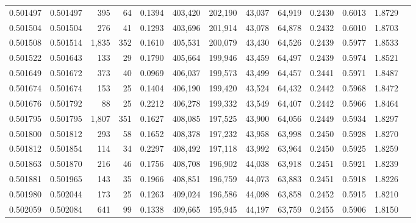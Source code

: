 \begin{tabular}{rrrrrrrrrrrrr}
0.501497 & 0.501497 &   395 &    64 &                                     0.1394 & 403,420 & 202,190 &  43,037 &  64,919 & 0.2430 & 0.6013 & 1.8729 \\
0.501504 & 0.501504 &   276 &    41 &                                     0.1293 & 403,696 & 201,914 &  43,078 &  64,878 & 0.2432 & 0.6010 & 1.8703 \\
0.501508 & 0.501514 & 1,835 &   352 &                                     0.1610 & 405,531 & 200,079 &  43,430 &  64,526 & 0.2439 & 0.5977 & 1.8533 \\
0.501522 & 0.501643 &   133 &    29 &                                     0.1790 & 405,664 & 199,946 &  43,459 &  64,497 & 0.2439 & 0.5974 & 1.8521 \\
0.501649 & 0.501672 &   373 &    40 &                                     0.0969 & 406,037 & 199,573 &  43,499 &  64,457 & 0.2441 & 0.5971 & 1.8487 \\
0.501674 & 0.501674 &   153 &    25 &                                     0.1404 & 406,190 & 199,420 &  43,524 &  64,432 & 0.2442 & 0.5968 & 1.8472 \\
0.501676 & 0.501792 &    88 &    25 &                                     0.2212 & 406,278 & 199,332 &  43,549 &  64,407 & 0.2442 & 0.5966 & 1.8464 \\
0.501795 & 0.501795 & 1,807 &   351 &                                     0.1627 & 408,085 & 197,525 &  43,900 &  64,056 & 0.2449 & 0.5934 & 1.8297 \\
0.501800 & 0.501812 &   293 &    58 &                                     0.1652 & 408,378 & 197,232 &  43,958 &  63,998 & 0.2450 & 0.5928 & 1.8270 \\
0.501812 & 0.501854 &   114 &    34 &                                     0.2297 & 408,492 & 197,118 &  43,992 &  63,964 & 0.2450 & 0.5925 & 1.8259 \\
0.501863 & 0.501870 &   216 &    46 &                                     0.1756 & 408,708 & 196,902 &  44,038 &  63,918 & 0.2451 & 0.5921 & 1.8239 \\
0.501881 & 0.501965 &   143 &    35 &                                     0.1966 & 408,851 & 196,759 &  44,073 &  63,883 & 0.2451 & 0.5918 & 1.8226 \\
0.501980 & 0.502044 &   173 &    25 &                                     0.1263 & 409,024 & 196,586 &  44,098 &  63,858 & 0.2452 & 0.5915 & 1.8210 \\
0.502059 & 0.502084 &   641 &    99 &                                     0.1338 & 409,665 & 195,945 &  44,197 &  63,759 & 0.2455 & 0.5906 & 1.8150 \\

\end{tabular}
